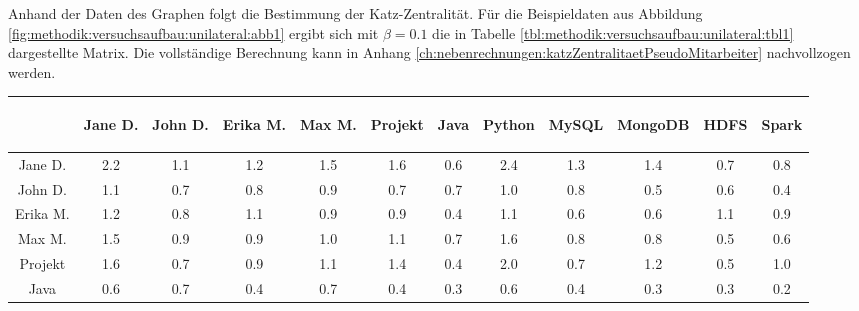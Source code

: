 Anhand der Daten des Graphen folgt die Bestimmung der Katz-Zentralität. Für die Beispieldaten aus Abbildung \ref{fig:methodik:versuchsaufbau:unilateral:abb1} ergibt sich mit $\beta = 0.1$ die in Tabelle \ref{tbl:methodik:versuchsaufbau:unilateral:tbl1} dargestellte Matrix. Die vollständige Berechnung kann in Anhang \ref{ch:nebenrechnungen:katzZentralitaetPseudoMitarbeiter} nachvollzogen werden.

\begin{table}[h]
	\centering
	\begin{tabular}{c|c|c|c|c|c|c|c|c|c|c|c}
		& \begin{sideways}Jane D.\end{sideways} & \begin{sideways}John D.\end{sideways} & \begin{sideways}Erika M.\end{sideways} & \begin{sideways}Max M.\end{sideways} & \begin{sideways}Projekt\end{sideways} & \begin{sideways}Java\end{sideways} & \begin{sideways}Python\end{sideways} & \begin{sideways}MySQL\end{sideways} & \begin{sideways}MongoDB\end{sideways} & \begin{sideways}HDFS\end{sideways} & \begin{sideways}Spark\end{sideways} \\
		\hline
		Jane D.  & 2.2 & 1.1 & 1.2 & 1.5 & 1.6 & 0.6 & 2.4 & 1.3 & 1.4 & 0.7 & 0.8\\
		John D.  & 1.1 & 0.7 & 0.8 & 0.9 & 0.7 & 0.7 & 1.0 & 0.8 & 0.5 & 0.6 & 0.4\\
		Erika M. & 1.2 & 0.8 & 1.1 & 0.9 & 0.9 & 0.4 & 1.1 & 0.6 & 0.6 & 1.1 & 0.9\\
		Max M.   & 1.5 & 0.9 & 0.9 & 1.0 & 1.1 & 0.7 & 1.6 & 0.8 & 0.8 & 0.5 & 0.6\\
		Projekt  & 1.6 & 0.7 & 0.9 & 1.1 & 1.4 & 0.4 & 2.0 & 0.7 & 1.2 & 0.5 & 1.0\\
		Java     & 0.6 & 0.7 & 0.4 & 0.7 & 0.4 & 0.3 & 0.6 & 0.4 & 0.3 & 0.3 & 0.2\\

\end{tabular}
\end{table}

